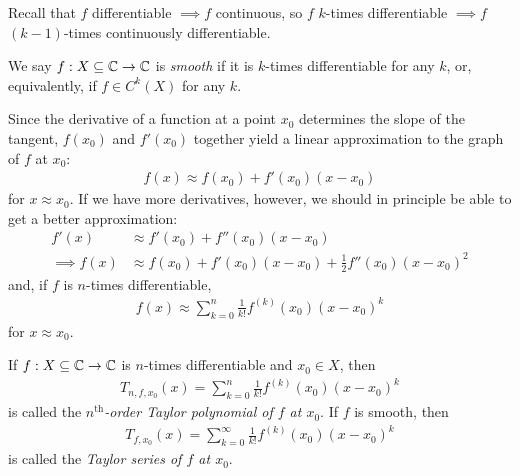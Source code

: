 \documentclass{../template/note}
\begin{document}
    \begin{remark*}
        Recall that \(f\) differentiable \(\implies f\) continuous, so \(f\) \(k\)-times differentiable \(\implies f\) \((k-1)\)-times continuously differentiable.
    \end{remark*}
    
    \begin{definition}[Smoothness]
        We say \(f: X \subseteq \mathbb C \to \mathbb C\) is \emph{smooth} if it is \(k\)-times differentiable for any \(k\), or, equivalently, if \(f \in C^k(X)\) for any \(k\).
    \end{definition}
    
    Since the derivative of a function at a point \(x_0\) determines the slope of the tangent, \(f(x_0)\) and \(f'(x_0)\) together yield a linear approximation to the graph of \(f\) at \(x_0\):
    \begin{align*}
        f(x) \approx f(x_0) + f'(x_0)(x-x_0)
    \end{align*}
    for \(x \approx x_0\). If we have more derivatives, however, we should in principle be able to get a better approximation:
    \begin{align*}
        f'(x) &\approx f'(x_0) + f''(x_0)(x-x_0) \\
        \implies f(x) &\approx f(x_0) + f'(x_0)(x-x_0) + \frac 1 2 f''(x_0)(x-x_0)^2 
    \end{align*}
    and, if \(f\) is \(n\)-times differentiable,
    \begin{align*}
        f(x) \approx \sum_{k=0}^n \frac 1 {k!} f^{(k)}(x_0)(x-x_0)^k
    \end{align*}
    for \(x \approx x_0\).    
    
    \begin{definition}
        If \(f: X \subseteq \mathbb C \to \mathbb C\) is \(n\)-times differentiable and \(x_0 \in X\), then
        \begin{align*}
            T_{n,f,x_0}(x) = \sum_{k=0}^n \frac 1 {k!} f^{(k)}(x_0)(x-x_0)^k
        \end{align*}
        is called the \emph{\(n^\text{th}\)-order Taylor polynomial of \(f\) at \(x_0\)}. If \(f\) is smooth, then
        \begin{align*}
            T_{f,x_0}(x) = \sum_{k=0}^\infty \frac 1 {k!} f^{(k)}(x_0)(x-x_0)^k
        \end{align*}
        is called the \emph{Taylor series of \(f\) at \(x_0\)}.        
    \end{definition}
    
\end{document}
